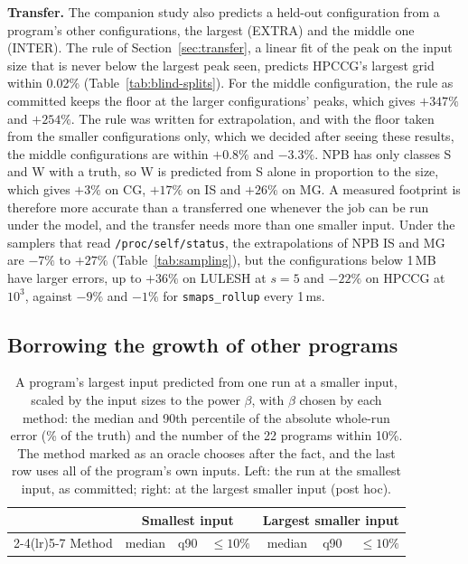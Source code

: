\documentclass[11pt]{article}
\newcommand{\secref}[1]{Section~\ref{#1}}
\newcommand{\tabref}[1]{Table~\ref{#1}}
\begin{document}
\textbf{Transfer.} The companion study also predicts a held-out configuration from a program's other configurations,
the largest (EXTRA) and the middle one (INTER). The rule of \secref{sec:transfer}, a linear fit of the peak on the input
size that is never below the largest peak seen, predicts HPCCG's largest grid within 0.02\% (\tabref{tab:blind-splits}).
For the middle configuration, the rule as committed keeps the floor at the larger configurations' peaks, which gives
$+347\%$ and $+254\%$. The rule was written for extrapolation, and with the floor taken from the smaller
configurations only, which we decided after seeing these results, the middle configurations are within $+0.8\%$ and
$-3.3\%$. NPB has only classes S and W with a truth, so W is predicted from S alone in proportion to the size, which
gives $+3\%$ on CG, $+17\%$ on IS and $+26\%$ on MG. A measured footprint is therefore more accurate than a transferred
one whenever the job can be run under the model, and the transfer needs more than one smaller input. Under the
samplers that read \texttt{/proc/self/status}, the extrapolations of NPB IS and MG are $-7\%$ to $+27\%$
(\tabref{tab:sampling}), but the configurations below 1\,MB have larger errors, up to $+36\%$ on LULESH at $s = 5$
and $-22\%$ on HPCCG at $10^3$, against $-9\%$ and $-1\%$ for \texttt{smaps\_rollup} every 1\,ms.

\subsection{Borrowing the growth of other programs}

\begin{table}[!htbp]
\centering
\small
\caption{A program's largest input predicted from one run at a smaller input, scaled by the input sizes to the power
$\beta$, with $\beta$ chosen by each method: the median and 90th percentile of the absolute whole-run error (\% of the
truth) and the number of the 22 programs within 10\%. The method marked as an oracle chooses after the fact, and the
last row uses all of the program's own inputs. Left: the run at the smallest input, as committed; right: at the
largest smaller input (post hoc).}
\label{tab:borrow}
\setlength{\tabcolsep}{4pt}
\begin{tabular}{lrrrrrr}
\toprule
 & \multicolumn{3}{c}{Smallest input} & \multicolumn{3}{c}{Largest smaller input} \\
\cmidrule(lr){2-4}\cmidrule(lr){5-7}
Method & median & q90 & $\le 10\%$ & median & q90 & $\le 10\%$ \\
\midrule

\bottomrule
\end{tabular}
\end{table}
\end{document}
